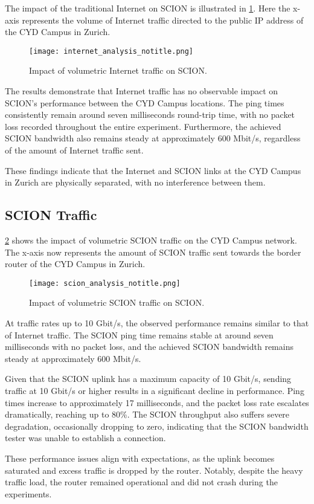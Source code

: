 The impact of the traditional Internet on SCION is illustrated in \cref{fig:internet_traffic}.
Here the x-axis represents the volume of Internet traffic directed to the public IP address of the CYD Campus in Zurich.

\begin{figure}[H]
    \centering
    \texttt{[image: internet\_analysis\_notitle.png]}
    \caption{Impact of volumetric Internet traffic on SCION.}
    \label{fig:internet_traffic}
\end{figure}

The results demonstrate that Internet traffic has no observable impact on SCION's performance between the CYD Campus locations.
The ping times consistently remain around seven milliseconds round-trip time, with no packet loss recorded throughout the entire experiment.
Furthermore, the achieved SCION bandwidth also remains steady at approximately 600 Mbit/s, regardless of the amount of Internet traffic sent.

These findings indicate that the Internet and SCION links at the CYD Campus in Zurich are physically separated, with no interference between them.


\subsection{SCION Traffic}

\cref{fig:scion_traffic} shows the impact of volumetric SCION traffic on the CYD Campus network.
The x-axis now represents the amount of SCION traffic sent towards the border router of the CYD Campus in Zurich.
\newpage
\begin{figure}[H]
    \centering
    \texttt{[image: scion\_analysis\_notitle.png]}
    \caption{Impact of volumetric SCION traffic on SCION.}
    \label{fig:scion_traffic}
\end{figure}

At traffic rates up to 10 Gbit/s, the observed performance remains similar to that of Internet traffic.
The SCION ping time remains stable at around seven milliseconds with no packet loss, and the achieved SCION bandwidth remains steady at approximately 600 Mbit/s.

Given that the SCION uplink has a maximum capacity of 10 Gbit/s, sending traffic at 10 Gbit/s or higher results in a significant decline in performance.
Ping times increase to approximately 17 milliseconds, and the packet loss rate escalates dramatically, reaching up to 80\%.
The SCION throughput also suffers severe degradation, occasionally dropping to zero, indicating that the SCION bandwidth tester was unable to establish a connection.

These performance issues align with expectations, as the uplink becomes saturated and excess traffic is dropped by the router.
Notably, despite the heavy traffic load, the router remained operational and did not crash during the experiments.

